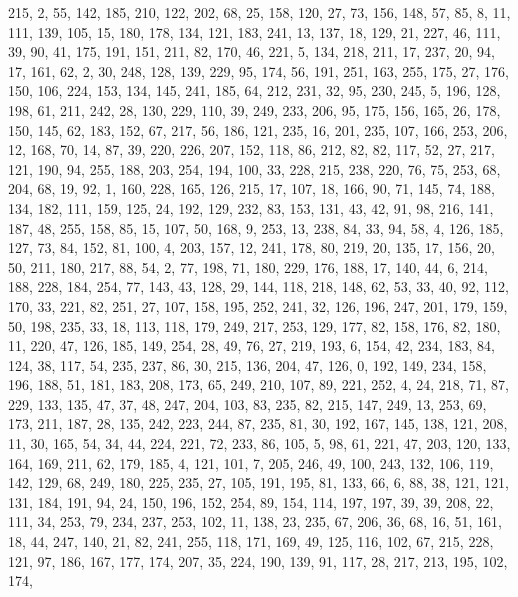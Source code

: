 \begin{DoxyCode}
       215, 2, 55, 142, 185, 210, 122, 202, 68, 25, 158, 120, 27, 73, 156, 148, 57, 85, 8, 11, 111, 139, 105, 15,
       180, 178, 134, 121, 183, 241, 13, 137, 18, 129, 21, 227, 46, 111, 39, 90, 41, 175, 191, 151, 211, 82, 170,
       46, 221, 5, 134, 218, 211, 17, 237, 20, 94, 17, 161, 62, 2, 30, 248, 128, 139, 229, 95, 174, 56, 191, 251,
       163, 255, 175, 27, 176, 150, 106, 224, 153, 134, 145, 241, 185, 64, 212, 231, 32, 95, 230, 245, 5, 196, 128,
       198, 61, 211, 242, 28, 130, 229, 110, 39, 249, 233, 206, 95, 175, 156, 165, 26, 178, 150, 145, 62, 183, 152,
       67, 217, 56, 186, 121, 235, 16, 201, 235, 107, 166, 253, 206, 12, 168, 70, 14, 87, 39, 220, 226, 207, 152,
       118, 86, 212, 82, 82, 117, 52, 27, 217, 121, 190, 94, 255, 188, 203, 254, 194, 100, 33, 228, 215, 238, 220,
       76, 75, 253, 68, 204, 68, 19, 92, 1, 160, 228, 165, 126, 215, 17, 107, 18, 166, 90, 71, 145, 74, 188, 134,
       182, 111, 159, 125, 24, 192, 129, 232, 83, 153, 131, 43, 42, 91, 98, 216, 141, 187, 48, 255, 158, 85, 15, 107,
       50, 168, 9, 253, 13, 238, 84, 33, 94, 58, 4, 126, 185, 127, 73, 84, 152, 81, 100, 4, 203, 157, 12, 241, 178,
       80, 219, 20, 135, 17, 156, 20, 50, 211, 180, 217, 88, 54, 2, 77, 198, 71, 180, 229, 176, 188, 17, 140, 44,
       6, 214, 188, 228, 184, 254, 77, 143, 43, 128, 29, 144, 118, 218, 148, 62, 53, 33, 40, 92, 112, 170, 33, 221,
       82, 251, 27, 107, 158, 195, 252, 241, 32, 126, 196, 247, 201, 179, 159, 50, 198, 235, 33, 18, 113, 118,
       179, 249, 217, 253, 129, 177, 82, 158, 176, 82, 180, 11, 220, 47, 126, 185, 149, 254, 28, 49, 76, 27, 219, 193,
       6, 154, 42, 234, 183, 84, 124, 38, 117, 54, 235, 237, 86, 30, 215, 136, 204, 47, 126, 0, 192, 149, 234,
       158, 196, 188, 51, 181, 183, 208, 173, 65, 249, 210, 107, 89, 221, 252, 4, 24, 218, 71, 87, 229, 133, 135, 47,
       37, 48, 247, 204, 103, 83, 235, 82, 215, 147, 249, 13, 253, 69, 173, 211, 187, 28, 135, 242, 223, 244, 87,
       235, 81, 30, 192, 167, 145, 138, 121, 208, 11, 30, 165, 54, 34, 44, 224, 221, 72, 233, 86, 105, 5, 98, 61,
       221, 47, 203, 120, 133, 164, 169, 211, 62, 179, 185, 4, 121, 101, 7, 205, 246, 49, 100, 243, 132, 106, 119,
       142, 129, 68, 249, 180, 225, 235, 27, 105, 191, 195, 81, 133, 66, 6, 88, 38, 121, 121, 131, 184, 191, 94, 24,
       150, 196, 152, 254, 89, 154, 114, 197, 197, 39, 39, 208, 22, 111, 34, 253, 79, 234, 237, 253, 102, 11, 138,
       23, 235, 67, 206, 36, 68, 16, 51, 161, 18, 44, 247, 140, 21, 82, 241, 255, 118, 171, 169, 49, 125, 116, 102,
       67, 215, 228, 121, 97, 186, 167, 177, 174, 207, 35, 224, 190, 139, 91, 117, 28, 217, 213, 195, 102, 174,

\end{DoxyCode}
